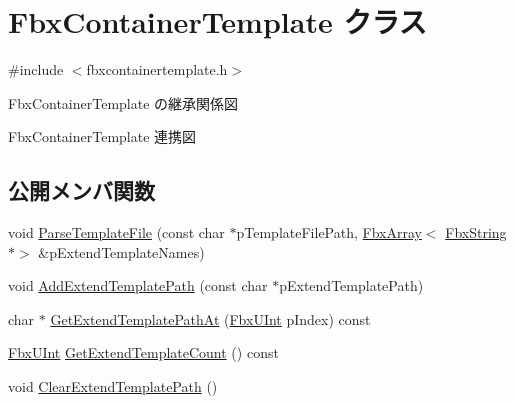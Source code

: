 \hypertarget{class_fbx_container_template}{}\section{Fbx\+Container\+Template クラス}
\label{class_fbx_container_template}


{\ttfamily \#include $<$fbxcontainertemplate.\+h$>$}



Fbx\+Container\+Template の継承関係図


Fbx\+Container\+Template 連携図
\subsection*{公開メンバ関数}
\begin{DoxyCompactItemize}
\item 
void \hyperlink{class_fbx_container_template_ae12881e9350b8eea3598874208f06e18}{Parse\+Template\+File} (const char $\ast$p\+Template\+File\+Path, \hyperlink{class_fbx_array}{Fbx\+Array}$<$ \hyperlink{class_fbx_string}{Fbx\+String} $\ast$$>$ \&p\+Extend\+Template\+Names)
\item 
void \hyperlink{class_fbx_container_template_aa3f0f367f7e95139f439169e340104df}{Add\+Extend\+Template\+Path} (const char $\ast$p\+Extend\+Template\+Path)
\item 
char $\ast$ \hyperlink{class_fbx_container_template_a09069044c9d47154b8981e592fd2b016}{Get\+Extend\+Template\+Path\+At} (\hyperlink{fbxtypes_8h_ae9fb141d8158a730aa85ec5ff2ea3f6b}{Fbx\+U\+Int} p\+Index) const
\item 
\hyperlink{fbxtypes_8h_ae9fb141d8158a730aa85ec5ff2ea3f6b}{Fbx\+U\+Int} \hyperlink{class_fbx_container_template_a552b2b289ce6ec39e031a0032234cac4}{Get\+Extend\+Template\+Count} () const
\item 
void \hyperlink{class_fbx_container_template_a6f2fbdd59ebc8966e980f5ed7e837d00}{Clear\+Extend\+Template\+Path} ()
\end{DoxyCompactItemize}
